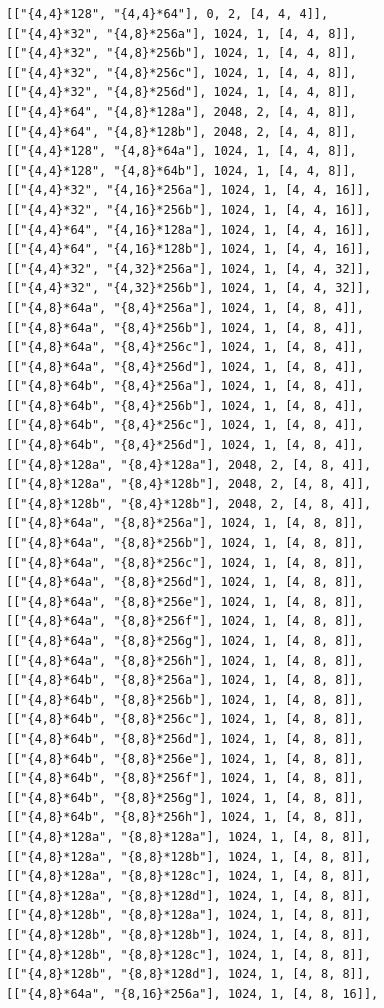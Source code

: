 \documentclass[
  11pt,
  a4paper,
]{article}
\begin{document}
\begin{verbatim}
[["{4,4}*128", "{4,4}*64"], 0, 2, [4, 4, 4]],
[["{4,4}*32", "{4,8}*256a"], 1024, 1, [4, 4, 8]],
[["{4,4}*32", "{4,8}*256b"], 1024, 1, [4, 4, 8]],
[["{4,4}*32", "{4,8}*256c"], 1024, 1, [4, 4, 8]],
[["{4,4}*32", "{4,8}*256d"], 1024, 1, [4, 4, 8]],
[["{4,4}*64", "{4,8}*128a"], 2048, 2, [4, 4, 8]],
[["{4,4}*64", "{4,8}*128b"], 2048, 2, [4, 4, 8]],
[["{4,4}*128", "{4,8}*64a"], 1024, 1, [4, 4, 8]],
[["{4,4}*128", "{4,8}*64b"], 1024, 1, [4, 4, 8]],
[["{4,4}*32", "{4,16}*256a"], 1024, 1, [4, 4, 16]],
[["{4,4}*32", "{4,16}*256b"], 1024, 1, [4, 4, 16]],
[["{4,4}*64", "{4,16}*128a"], 1024, 1, [4, 4, 16]],
[["{4,4}*64", "{4,16}*128b"], 1024, 1, [4, 4, 16]],
[["{4,4}*32", "{4,32}*256a"], 1024, 1, [4, 4, 32]],
[["{4,4}*32", "{4,32}*256b"], 1024, 1, [4, 4, 32]],
[["{4,8}*64a", "{8,4}*256a"], 1024, 1, [4, 8, 4]],
[["{4,8}*64a", "{8,4}*256b"], 1024, 1, [4, 8, 4]],
[["{4,8}*64a", "{8,4}*256c"], 1024, 1, [4, 8, 4]],
[["{4,8}*64a", "{8,4}*256d"], 1024, 1, [4, 8, 4]],
[["{4,8}*64b", "{8,4}*256a"], 1024, 1, [4, 8, 4]],
[["{4,8}*64b", "{8,4}*256b"], 1024, 1, [4, 8, 4]],
[["{4,8}*64b", "{8,4}*256c"], 1024, 1, [4, 8, 4]],
[["{4,8}*64b", "{8,4}*256d"], 1024, 1, [4, 8, 4]],
[["{4,8}*128a", "{8,4}*128a"], 2048, 2, [4, 8, 4]],
[["{4,8}*128a", "{8,4}*128b"], 2048, 2, [4, 8, 4]],
[["{4,8}*128b", "{8,4}*128b"], 2048, 2, [4, 8, 4]],
[["{4,8}*64a", "{8,8}*256a"], 1024, 1, [4, 8, 8]],
[["{4,8}*64a", "{8,8}*256b"], 1024, 1, [4, 8, 8]],
[["{4,8}*64a", "{8,8}*256c"], 1024, 1, [4, 8, 8]],
[["{4,8}*64a", "{8,8}*256d"], 1024, 1, [4, 8, 8]],
[["{4,8}*64a", "{8,8}*256e"], 1024, 1, [4, 8, 8]],
[["{4,8}*64a", "{8,8}*256f"], 1024, 1, [4, 8, 8]],
[["{4,8}*64a", "{8,8}*256g"], 1024, 1, [4, 8, 8]],
[["{4,8}*64a", "{8,8}*256h"], 1024, 1, [4, 8, 8]],
[["{4,8}*64b", "{8,8}*256a"], 1024, 1, [4, 8, 8]],
[["{4,8}*64b", "{8,8}*256b"], 1024, 1, [4, 8, 8]],
[["{4,8}*64b", "{8,8}*256c"], 1024, 1, [4, 8, 8]],
[["{4,8}*64b", "{8,8}*256d"], 1024, 1, [4, 8, 8]],
[["{4,8}*64b", "{8,8}*256e"], 1024, 1, [4, 8, 8]],
[["{4,8}*64b", "{8,8}*256f"], 1024, 1, [4, 8, 8]],
[["{4,8}*64b", "{8,8}*256g"], 1024, 1, [4, 8, 8]],
[["{4,8}*64b", "{8,8}*256h"], 1024, 1, [4, 8, 8]],
[["{4,8}*128a", "{8,8}*128a"], 1024, 1, [4, 8, 8]],
[["{4,8}*128a", "{8,8}*128b"], 1024, 1, [4, 8, 8]],
[["{4,8}*128a", "{8,8}*128c"], 1024, 1, [4, 8, 8]],
[["{4,8}*128a", "{8,8}*128d"], 1024, 1, [4, 8, 8]],
[["{4,8}*128b", "{8,8}*128a"], 1024, 1, [4, 8, 8]],
[["{4,8}*128b", "{8,8}*128b"], 1024, 1, [4, 8, 8]],
[["{4,8}*128b", "{8,8}*128c"], 1024, 1, [4, 8, 8]],
[["{4,8}*128b", "{8,8}*128d"], 1024, 1, [4, 8, 8]],
[["{4,8}*64a", "{8,16}*256a"], 1024, 1, [4, 8, 16]],

\end{verbatim}
\end{document}
